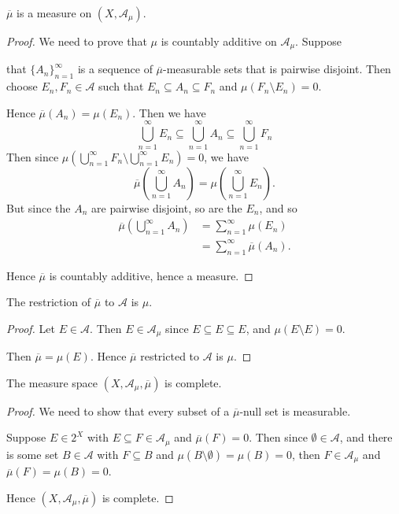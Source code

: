 \documentclass{unswmaths}
\begin{document}
\begin{lemma}
    $\overline{\mu}$ is a measure on $(X,\mathcal{A}_\mu)$.
\end{lemma}
\begin{proof}
    We need to prove that $\mu$ is countably additive on $\mathcal{A}_\mu$. Suppose
    
    that $\{A_n\}_{n=1}^\infty$ is a sequence of $\overline{\mu}$-measurable sets
    that is pairwise disjoint. Then choose $E_n,F_n \in \mathcal{A}$
    such that $E_n \subseteq A_n \subseteq F_n$ and $\mu(F_n\setminus E_n) = 0$. 
    
    Hence $\overline{\mu}(A_n) = \mu(E_n)$. 
    Then we have
    \begin{equation*}
        \bigcup_{n=1}^\infty  E_n \subseteq\bigcup_{n=1}^\infty A_n \subseteq  \bigcup_{n=1}^\infty F_n
    \end{equation*}
    Then since ${\mu}(\bigcup_{n=1}^\infty F_n\setminus \bigcup_{n=1}^\infty E_n) = 0$,
    we have
    \begin{equation*}
        \overline{\mu}(\bigcup_{n=1}^\infty A_n) = \mu(\bigcup_{n=1}^\infty E_n).
    \end{equation*} 
    But since the $A_n$ are pairwise disjoint, so are the $E_n$, and so
    \begin{align*}
        \overline{\mu}(\bigcup_{n=1}^\infty A_n) &= \sum_{n=1}^\infty \mu(E_n)\\ 
        &= \sum_{n=1}^\infty \overline{\mu}(A_n).
    \end{align*}
    
    Hence $\overline{\mu}$ is countably additive, hence a measure.
   
\end{proof} 

\begin{lemma}
    The restriction of $\overline{\mu}$ to $\mathcal{A}$
    is $\mu$.
\end{lemma}
\begin{proof}
    Let $E \in \mathcal{A}$. Then $E \in \mathcal{A}_\mu$
    since $E\subseteq E\subseteq E$, and $\mu (E\setminus E) = 0$.
    
    Then $\overline{\mu} = \mu(E)$. Hence $\overline{\mu}$
    restricted to $\mathcal{A}$ is $\mu$.
\end{proof}

\begin{lemma}
    The measure space $(X,\mathcal{A}_\mu,\overline{\mu})$
    is complete.
\end{lemma}
\begin{proof}
    We need to show that every subset of a $\overline{\mu}$-null
    set is measurable.
    
    Suppose $E \in 2^X$ with $E \subseteq F \in \mathcal{A}_\mu$
    and $\overline{\mu}(F) = 0$. Then since $\emptyset \in \mathcal{A}$,
    and there is some set $B \in \mathcal{A}$ with $F \subseteq B$
    and $\mu(B\setminus \emptyset) = \mu(B) = 0$,
    then $F \in \mathcal{A}_\mu$ and $\overline{\mu}(F) = \mu(B) = 0$.
    
    Hence $(X,\mathcal{A}_\mu, \overline{\mu})$ is complete.
\end{proof} 
\end{document}
